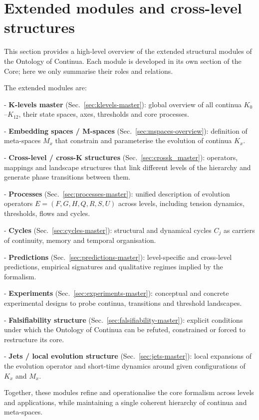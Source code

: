 
\section*{Extended modules and cross-level structures}
\label{sec:modules_master}

This section provides a high-level overview of the extended structural modules
of the Ontology of Continua. Each module is developed in its own section of
the Core; here we only summarise their roles and relations.

The extended modules are:

- \textbf{K-levels master} (Sec.~\ref{sec:klevels-master}): 
  global overview of all continua \(K_0\)–\(K_{12}\), their state spaces,
  axes, thresholds and core processes.

- \textbf{Embedding spaces / M-spaces} (Sec.~\ref{sec:mspaces-overview}):
  definition of meta-spaces \(M_x\) that constrain and parameterise the
  evolution of continua \(K_x\).

- \textbf{Cross-level / cross-K structures} (Sec.~\ref{sec:crossk_master}):
  operators, mappings and landscape structures that link different levels
  of the hierarchy and generate phase transitions between them.

- \textbf{Processes} (Sec.~\ref{sec:processes-master}):
  unified description of evolution operators \(E = (F,G,H,Q,R,S,U)\) across
  levels, including tension dynamics, thresholds, flows and cycles.

- \textbf{Cycles} (Sec.~\ref{sec:cycles-master}):
  structural and dynamical cycles \(C_j\) as carriers of continuity,
  memory and temporal organisation.

- \textbf{Predictions} (Sec.~\ref{sec:predictions-master}):
  level-specific and cross-level predictions, empirical signatures and
  qualitative regimes implied by the formalism.

- \textbf{Experiments} (Sec.~\ref{sec:experiments-master}):
  conceptual and concrete experimental designs to probe continua,
  transitions and threshold landscapes.

- \textbf{Falsifiability structure} (Sec.~\ref{sec:falsifiability-master}):
  explicit conditions under which the Ontology of Continua can be
  refuted, constrained or forced to restructure its core.

- \textbf{Jets / local evolution structure} (Sec.~\ref{sec:jets-master}):
  local expansions of the evolution operator and short-time dynamics
  around given configurations of \(K_x\) and \(M_x\).

Together, these modules refine and operationalise the core formalism across
levels and applications, while maintaining a single coherent hierarchy of
continua and meta-spaces.
